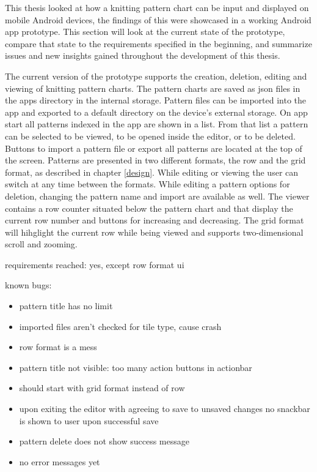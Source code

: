This thesis looked at how a knitting pattern chart can be input and displayed on mobile Android devices, the findings of this were showcased in a working Android app prototype. This section will look at the current state of the prototype, compare that state to the requirements specified in the beginning, and summarize issues and new insights gained throughout the development of this thesis.

The current version of the prototype supports the creation, deletion, editing and viewing of knitting pattern charts. The pattern charts are saved as \gls{json} files in the apps directory in the internal storage. Pattern files can be imported into the app and exported to a default directory on the device's external storage. On app start all patterns indexed in the app are shown in a list. From that list a pattern can be selected to be viewed, to be opened inside the editor, or to be deleted. Buttons to import a pattern file or export all patterns are located at the top of the screen. Patterns are presented in two different formats, the row and the grid format, as described in chapter \ref{design}. While editing or viewing the user can switch at any time between the formats. While editing a pattern options for deletion, changing the pattern name and import are available as well. The viewer contains a row counter situated below the pattern chart and that display the current row number and buttons for increasing and decreasing. The grid format will hihglight the current row while being viewed and supports two-dimensional scroll and zooming.




requirements reached:
yes, except row format ui

known bugs:
\begin{itemize}
\item pattern title has no limit
\item imported files aren't checked for tile type, cause crash
\item row format is a mess
\item pattern title not visible: too many action buttons in actionbar
\item should start with grid format instead of row
\item upon exiting the editor with agreeing to save to unsaved changes no snackbar is shown to user upon successful save
\item pattern delete does not show success message
\item no error messages yet
\end{itemize}

